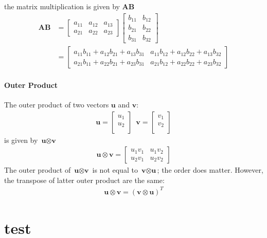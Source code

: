  the matrix multiplication is given by \textbf{AB}
\begin{align}
  \textbf{A}\textbf{B} &= \begin{bmatrix}
    a_{11} & a_{12} & a_{13} \\
    a_{21} & a_{22} & a_{23}
  \end{bmatrix} \begin{bmatrix}
    b_{11} & b_{12} \\
    b_{21} & b_{22} \\
    b_{31} & b_{32}
  \end{bmatrix} \\
  &= \begin{bmatrix}
    a_{11}b_{11} + a_{12}b_{21} + a_{13}b_{31} &  a_{11}b_{12} + a_{12}b_{22} + a_{13}b_{32} \\
    a_{21}b_{11} + a_{22}b_{21} + a_{23}b_{31} &  a_{21}b_{12} + a_{22}b_{22} + a_{23}b_{32}
  \end{bmatrix}
\end{align}
\subsubsection{Outer Product}
\noindent The outer product of two vectors $\textbf{u}$ and $\textbf{v}$: 
\begin{align}
    \textbf{u} = \begin{bmatrix}
        u_1 \\
        u_2 \\
      \end{bmatrix} \, \, \, 
      \textbf{v} = \begin{bmatrix}
        v_1 \\
        v_2 \\
      \end{bmatrix}
\end{align}
is given by $\textbf{u}\otimes\textbf{v}$
\begin{align}
  \textbf{u}\otimes\textbf{v} = \begin{bmatrix}
    u_1v_1 & u_1v_2 \\
    u_2v_1 & u_2v_2
  \end{bmatrix}
\end{align}
The outer product of $\textbf{u}\otimes\textbf{v}$ is not equal to $\textbf{v}\otimes\textbf{u}$; the order does matter. However, the transpose of latter outer product are the same:
\begin{align}
  \textbf{u}\otimes\textbf{v} = (\textbf{v}\otimes\textbf{u})^T 
\end{align}
\chapter{test}